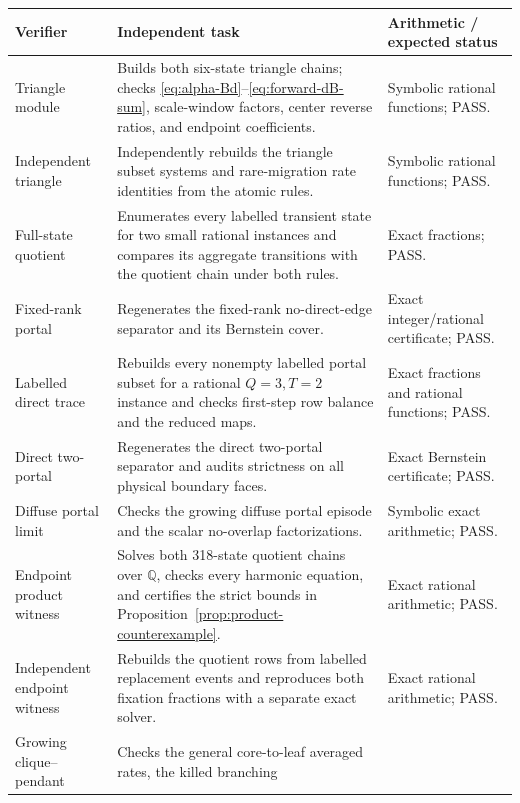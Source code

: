 \documentclass[11pt]{article}
\theoremstyle{definition}
\theoremstyle{remark}
\begin{document}
\begin{table}[H]
\centering
\scriptsize
\renewcommand{\arraystretch}{1.12}
\begin{tabularx}{\textwidth}{>{\raggedright\arraybackslash}p{}
                              >{\raggedright\arraybackslash}p{}
                              >{\raggedright\arraybackslash}X}
\toprule
Verifier & Independent task & Arithmetic / expected status\\
\midrule
Triangle module
& Builds both six-state triangle chains; checks
\eqref{eq:alpha-Bd}--\eqref{eq:forward-dB-sum}, scale-window factors,
center reverse ratios, and endpoint coefficients.
& Symbolic rational functions; PASS.\\
Independent triangle
& Independently rebuilds the triangle subset systems and rare-migration
rate identities from the atomic rules.
& Symbolic rational functions; PASS.\\
Full-state quotient
& Enumerates every labelled transient state for two small rational instances
and compares its aggregate transitions with the quotient chain under both
rules.
& Exact fractions; PASS.\\
Fixed-rank portal
& Regenerates the fixed-rank no-direct-edge separator and its Bernstein cover.
& Exact integer/rational certificate; PASS.\\
Labelled direct trace
& Rebuilds every nonempty labelled portal subset for a rational
$Q=3,T=2$ instance and checks first-step row balance and the reduced maps.
& Exact fractions and rational functions; PASS.\\
Direct two-portal
& Regenerates the direct two-portal separator and audits strictness on all
physical boundary faces.
& Exact Bernstein certificate; PASS.\\
Diffuse portal limit
& Checks the growing diffuse portal episode and the scalar no-overlap
factorizations.
& Symbolic exact arithmetic; PASS.\\
Endpoint product witness
& Solves both 318-state quotient chains over $\mathbb Q$, checks every
harmonic equation, and certifies the strict bounds in
Proposition~\ref{prop:product-counterexample}.
& Exact rational arithmetic; PASS.\\
Independent endpoint witness
& Rebuilds the quotient rows from labelled replacement events and reproduces
both fixation fractions with a separate exact solver.
& Exact rational arithmetic; PASS.\\
Growing clique--pendant
& Checks the general core-to-leaf averaged rates, the killed branching

\end{tabularx}
\end{table}
\end{document}
